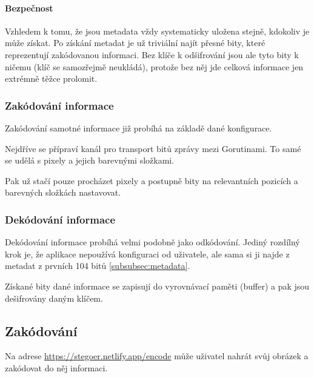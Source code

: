 \paragraph{Bezpečnost}
Vzhledem k tomu, že jsou metadata vždy systematicky uložena stejně,
kdokoliv je může získat.
Po získání metadat je už triviální najít přesné bity, které reprezentují
zakódovanou informaci.
Bez klíče k odšifrování jsou ale tyto bity k ničemu
(klíč se samozřejmě neukládá), protože bez něj jde celková informace jen
extrémně těžce prolomit\cite{enwiki:aes}.

\subsubsection{Zakódování informace}\label{subsubsec:zakodovani-informace}
Zakódování samotné informace již probíhá na základě dané konfigurace.

Nejdříve se přípraví kanál pro transport bitů zprávy mezi Gorutinami.
To samé se udělá s pixely a jejich barevnými složkami.

Pak už stačí pouze procházet pixely a postupně bity na relevantních pozicích a
barevných složkách nastavovat.

\subsubsection{Dekódování informace}\label{subsubsec:dekodovani-informace}
Dekódování informace probíhá velmi podobně jako odkódování.
Jediný rozdílný krok je, že aplikace nepoužívá konfiguraci od uživatele, ale
sama si ji najde z metadat z prvních 104 bitů \ref{subsubsec:metadata}.

Získané bity dané informace se zapisují do vyrovnávací paměti (buffer) a pak
jsou dešifrovány daným klíčem.

\subsection{Zakódování}\label{subsec:zakodovani-dat}
Na adrese \url{https://stegoer.netlify.app/encode} může uživatel nahrát svůj
obrázek a zakódovat do něj informaci.

